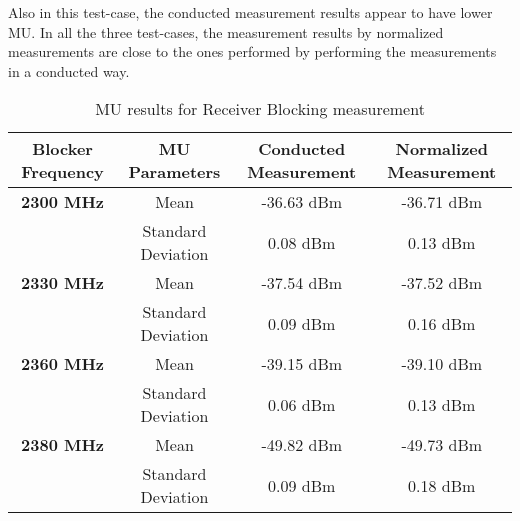 Also in this test-case, the conducted measurement results appear to have lower \acs{MU}. In all the three test-cases, the measurement results by normalized measurements are close to the ones performed by performing the measurements in a conducted way.
\begin{table}[H]
\resizebox{\textwidth}{!}
{
        \begin{tabular}{|c|c|c|c|}\toprule
         \textbf{Blocker Frequency} & \textbf{MU Parameters} &\textbf{Conducted Measurement} & \textbf{Normalized Measurement} \\
            \midrule
            \textbf{2300 MHz} & Mean                      & -36.63 dBm & -36.71 dBm \\
                             & Standard Deviation & 0.08 dBm    & 0.13 dBm  \\
                             \midrule
            \textbf{2330 MHz} & Mean                      & -37.54 dBm & -37.52 dBm       \\
                             & Standard Deviation & 0.09 dBm    & 0.16 dBm       \\
                             \midrule
            \textbf{2360 MHz} & Mean                      & -39.15 dBm & -39.10 dBm     \\
                             & Standard Deviation & 0.06 dBm    & 0.13 dBm      \\
                             \midrule
            \textbf{2380 MHz} & Mean                      & -49.82 dBm & -49.73 dBm       \\
                             & Standard Deviation & 0.09 dBm    & 0.18 dBm \\
           \bottomrule
        \end{tabular}}
        \caption{\acf{MU} results for Receiver Blocking measurement}\label{tab:Tab3}
 \end{table} 




